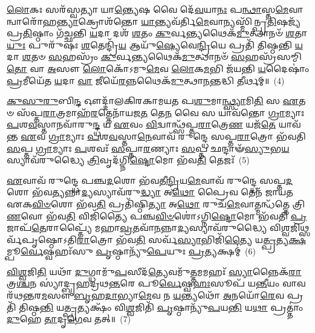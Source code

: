 \-\ul{𑌲𑍋}\-𑌕𑌃 𑌸𑌰᳴𑌸𑍍𑌵𑌤𑍍𑌯𑌾 𑌯𑌾\-\ul{𑌨𑍍𑌤𑍍𑌯𑍇}\-𑌷 𑌵𑍈 𑌦𑍇᳴\-\ul{𑌵}\-𑌯𑌾\-\ul{𑌨𑌃} 𑌪\-\ul{𑌨𑍍𑌥𑌾}\-𑌸𑍍𑌤\-\ul{𑌮𑍇}\-𑌵𑌾𑌨𑍍𑌵𑌾𑌰𑍋᳴𑌹\-\ul{𑌨𑍍𑌤𑍍𑌯𑌾}\-𑌕𑍍𑌰𑍋𑌶᳴𑌨𑍍𑌤𑍋 \ul{𑌯𑌾}\-𑌨𑍍𑌤𑍍𑌯𑌵᳴𑌰𑍍𑌤𑌿\-\ul{𑌮𑍇}\-𑌵𑌾𑌨𑍍𑌯𑌸𑍍𑌮𑌿᳴𑌨𑍍𑌪𑍍𑌰\-\ul{𑌤𑌿}\-𑌷𑌜𑍍𑌯᳴ 𑌪𑍍𑌰\-\ul{𑌤𑌿}\-𑌷𑍍𑌠𑌾𑌂 𑌗᳴𑌚𑍍𑌛𑌨𑍍𑌤𑌿 \ul{𑌯}\-𑌦𑌾 𑌦𑌶᳴ \ul{𑌶}\-𑌤𑌂 \ul{𑌕𑍁}\-𑌰𑍍𑌵𑌨𑍍𑌤𑍍𑌯𑌥𑍈𑌕᳴\-\ul{𑌮𑍁}\-𑌤𑍍𑌥𑌾𑌨𑍞᳴ \ul{𑌶}\-𑌤𑌾\-\ul{𑌯𑍁𑌃} 𑌪𑍁𑌰𑍁᳴𑌷𑌃 \ul{𑌶}\-𑌤𑍇𑌨𑍍𑌦𑍍𑌰𑌿᳴\-\ul{𑌯} 𑌆𑌯𑍁᳴\-\ul{𑌷𑍍𑌯𑍇}\-𑌵𑍇\-\ul{𑌨𑍍𑌦𑍍𑌰𑌿}\-𑌯𑍇 𑌪𑍍𑌰𑌤𑌿᳴ 𑌤𑌿𑌷𑍍𑌠𑌨𑍍𑌤𑌿 \ul{𑌯}\-𑌦𑌾 \ul{𑌶}\-𑌤𑍞 \ul{𑌸}\-𑌹𑌸𑍍𑌰𑌂᳴ \ul{𑌕𑍁}\-𑌰𑍍𑌵𑌨𑍍𑌤𑍍𑌯𑌥𑍈𑌕᳴\-\ul{𑌮𑍁}\-𑌤𑍍𑌥𑌾𑌨𑍞᳴ \ul{𑌸}\-𑌹𑌸𑍍𑌰᳴𑌸𑌮𑍍𑌮𑌿\-\ul{𑌤𑍋} 𑌵𑌾 \ul{𑌅}\-𑌸𑍗 \ul{𑌲𑍋}\-𑌕𑍋᳴\-𑌽𑌮𑍁\-\ul{𑌮𑍇}\-𑌵 \ul{𑌲𑍋}\-𑌕\-\ul{𑌮}\-𑌭𑌿 𑌜᳴𑌯𑌨𑍍𑌤𑌿 \ul{𑌯}\-𑌦𑍈𑌷𑌾𑌂॑ \ul{𑌪𑍍𑌰}\-𑌮𑍀𑌯𑍇᳴𑌤 \ul{𑌯}\-𑌦𑌾 \ul{𑌵𑌾} 𑌜𑍀𑌯𑍇᳴\-\ul{𑌰}\-𑌨𑍍𑌨𑌥𑍈𑌕᳴\-\ul{𑌮𑍁}\-𑌤𑍍𑌥𑌾\-\ul{𑌨}\-𑌨𑍍𑌤𑌦𑍍𑌧𑌿 \ul{𑌤𑍀}\-𑌰𑍍𑌥𑌮𑍍॥~(4)

{\anuvakamend[{\-\ul{𑌪𑍃}\-𑌷𑍍𑌠𑌾𑌨𑌿᳴ 𑌸𑌪𑍍𑌤\-\ul{𑌦}\-𑌶𑌃 𑌸𑍁᳴\-\ul{𑌵}\-𑌰𑍍𑌗𑍋 𑌜᳴𑌯𑌨𑍍𑌤𑌿 \ul{𑌯}\-𑌦𑍈𑌕𑌾᳴\-𑌦𑌶 𑌚}]}%

\-\ul{𑌕𑍁}\-\-\ul{𑌸𑍁}\-\-\ul{𑌰𑍁}\-𑌬𑌿\-\ul{𑌨𑍍𑌦} 𑌔𑌦𑍍𑌦𑌾᳴𑌲𑌕𑌿𑌰𑌕𑌾𑌮𑌯𑌤 𑌪\-\ul{𑌶𑍁}\-𑌮𑌾\-\ul{𑌨𑍍𑌥𑍍𑌸𑍍𑌯𑌾}\-𑌮𑌿\-\ul{𑌤𑌿} 𑌸 \ul{𑌏}\-𑌤𑍞 𑌸᳴𑌪𑍍𑌤\-\ul{𑌰𑌾}\-𑌤𑍍𑌰𑌮𑌾𑌹᳴\-\ul{𑌰}\-𑌤𑍍𑌤𑍇𑌨𑌾᳴𑌯𑌜\-\ul{𑌤} 𑌤𑍇\-\ul{𑌨} 𑌵𑍈 𑌸 𑌯𑌾𑌵᳴𑌨𑍍𑌤𑍋 \ul{𑌗𑍍𑌰𑌾}\-𑌮𑍍𑌯𑌾𑌃 \ul{𑌪}\-𑌶\-\ul{𑌵}\-𑌸𑍍𑌤𑌾𑌨𑌵𑌾᳴𑌰𑍁\-\ul{𑌨𑍍𑌦𑍍𑌧} 𑌯 \ul{𑌏}\-𑌵𑌂 \ul{𑌵𑌿}\-𑌦𑍍𑌵𑌾𑌨𑍍𑌥𑍍𑌸᳴𑌪𑍍𑌤\-\ul{𑌰𑌾}\-𑌤𑍍𑌰𑍇\-\ul{𑌣} 𑌯𑌜᳴\-\ul{𑌤𑍇} 𑌯𑌾𑌵᳴𑌨𑍍𑌤 \ul{𑌏}\-𑌵 \ul{𑌗𑍍𑌰𑌾}\-𑌮𑍍𑌯𑌾𑌃 \ul{𑌪}\-𑌶\-\ul{𑌵}\-𑌸𑍍𑌤𑌾\-\ul{𑌨𑍇}\-𑌵𑌾𑌵᳴ 𑌰𑍁𑌨𑍍𑌦𑍍𑌧𑍇 𑌸𑌪𑍍𑌤\-\ul{𑌰𑌾}\-𑌤𑍍𑌰𑍋 𑌭᳴𑌵𑌤𑌿 \ul{𑌸}\-𑌪𑍍𑌤 \ul{𑌗𑍍𑌰𑌾}\-𑌮𑍍𑌯𑌾𑌃 \ul{𑌪}\-𑌶𑌵𑌃᳴ \ul{𑌸}\-𑌪𑍍𑌤𑌾\-\ul{𑌰}\-𑌣𑍍𑌯𑌾𑌃 \ul{𑌸}\-𑌪𑍍𑌤 𑌛𑌨𑍍𑌦𑌾𑍟᳴\-\ul{𑌸𑍍𑌯𑍁}\-𑌭\-\ul{𑌯}\-𑌸𑍍𑌯𑌾𑌵᳴𑌰𑍁𑌦𑍍𑌧𑍍𑌯𑍈 \ul{𑌤𑍍𑌰𑌿}\-𑌵𑍃𑌦᳴𑌗𑍍𑌨𑌿\-\ul{𑌷𑍍𑌟𑍋}\-𑌮𑍋 𑌭᳴𑌵\-\ul{𑌤𑌿} 𑌤𑍇𑌜𑌃᳴~(5)

\-\ul{𑌏}\-𑌵𑌾𑌵᳴ 𑌰𑍁𑌨𑍍𑌦𑍍𑌧𑍇 𑌪𑌞𑍍𑌚\-\ul{𑌦}\-𑌶𑍋 𑌭᳴𑌵𑌤𑍀\-\ul{𑌨𑍍𑌦𑍍𑌰𑌿}\-𑌯\-\ul{𑌮𑍇}\-𑌵𑌾𑌵᳴ 𑌰𑍁𑌨𑍍𑌦𑍍𑌧𑍇 𑌸𑌪𑍍𑌤\-\ul{𑌦}\-𑌶𑍋 𑌭᳴𑌵\-\ul{𑌤𑍍𑌯}\-𑌨𑍍𑌨𑌾\-\ul{𑌦𑍍𑌯}\-𑌸𑍍𑌯𑌾𑌵᳴𑌰𑍁\-\ul{𑌦𑍍𑌧𑍍𑌯𑌾} 𑌅\-\ul{𑌥𑍋} 𑌪𑍍𑌰𑍈𑌵 𑌤𑍇𑌨᳴ 𑌜𑌾𑌯𑌤 𑌏𑌕\-\ul{𑌵𑌿}\-\-\ul{𑍞}\-𑌶𑍋 𑌭᳴𑌵\-\ul{𑌤𑌿} 𑌪𑍍𑌰𑌤𑌿᳴𑌷𑍍𑌠𑌿\-\ul{𑌤𑍍𑌯𑌾} 𑌅\-\ul{𑌥𑍋} 𑌰𑍁𑌚᳴\-\ul{𑌮𑍇}\-𑌵𑌾𑌤𑍍𑌮𑌨𑍍𑌧᳴𑌤𑍍𑌤𑍇 𑌤𑍍𑌰𑌿\-\ul{𑌣}\-𑌵𑍋 𑌭᳴𑌵\-\ul{𑌤𑌿} 𑌵𑌿𑌜𑌿᳴𑌤𑍍𑌯𑍈 𑌪𑌞𑍍𑌚\-\ul{𑌵𑌿}\-\-\ul{𑍞}\-𑌶𑍋॑\-𑌽𑌗𑍍𑌨𑌿\-\ul{𑌷𑍍𑌟𑍋}\-𑌮𑍋 𑌭᳴𑌵𑌤𑌿 \ul{𑌪𑍍𑌰}\-𑌜𑌾𑌪᳴\-\ul{𑌤𑍇}\-𑌰𑌾𑌪𑍍𑌤𑍍𑌯𑍈᳴ 𑌮𑌹𑌾\-\ul{𑌵𑍍𑌰}\-𑌤𑌵𑌾᳴\-\ul{𑌨}\-𑌨𑍍𑌨𑌾\-\ul{𑌦𑍍𑌯}\-𑌸𑍍𑌯𑌾𑌵᳴𑌰𑍁𑌦𑍍𑌧𑍍𑌯𑍈 𑌵𑌿\-\ul{𑌶𑍍𑌵}\-𑌜𑌿𑌥𑍍𑌸𑌰𑍍𑌵᳴𑌪𑍃𑌷𑍍𑌠𑍋\-𑌽𑌤𑌿\-\ul{𑌰𑌾}\-𑌤𑍍𑌰𑍋 𑌭᳴𑌵\-\ul{𑌤𑌿} 𑌸𑌰𑍍𑌵᳴\-\ul{𑌸𑍍𑌯𑌾}\-𑌭𑌿𑌜𑌿᳴\-\ul{𑌤𑍍𑌯𑍈} 𑌯\-\ul{𑌤𑍍𑌪𑍍𑌰}\-𑌤𑍍𑌯\-\ul{𑌕𑍍𑌷}\-𑌮𑍍𑌪𑍂\-\ul{𑌰𑍍𑌵𑍇}\-𑌷𑍍𑌵𑌹𑌃᳴𑌸𑍁 \ul{𑌪𑍃}\-𑌷𑍍𑌠𑌾𑌨𑍍𑌯𑍁᳴\-\ul{𑌪𑍇}\-𑌯𑍁𑌃 \ul{𑌪𑍍𑌰}\-𑌤𑍍𑌯𑌕𑍍𑌷𑌮𑍍॑~(6)

\-\ul{𑌵𑌿}\-\-\ul{𑌶𑍍𑌵}\-𑌜𑌿\-\ul{𑌤𑌿} 𑌯𑌥𑌾᳴ \ul{𑌦𑍁}\-𑌗𑍍𑌧𑌾𑌮𑍁᳴\-\ul{𑌪}\-𑌸𑍀𑌦᳴\-\ul{𑌤𑍍𑌯𑍇}\-𑌵𑌮𑍁᳴\-\ul{𑌤𑍍𑌤}\-𑌮𑌮𑌹𑌃᳴ \ul{𑌸𑍍𑌯𑌾}\-𑌨𑍍𑌨𑍈𑌕᳴\-\ul{𑌰𑌾}\-𑌤𑍍𑌰\-\ul{𑌶𑍍𑌚}\-𑌨 𑌸𑍍𑌯𑌾॑𑌦𑍍𑌬𑍃𑌹𑌦𑍍𑌰𑌥\-\ul{𑌨𑍍𑌤}\-𑌰𑍇 𑌪𑍂\-\ul{𑌰𑍍𑌵𑍇}\-𑌷𑍍𑌵\-\ul{𑌹𑌃}\-𑌸𑍂𑌪᳴ 𑌯\-\ul{𑌨𑍍𑌤𑍀}\-𑌯𑌂 𑌵𑌾𑌵 𑌰᳴𑌥\-\ul{𑌨𑍍𑌤}\-𑌰\-\ul{𑌮}\-𑌸𑍗 \ul{𑌬𑍃}\-𑌹\-\ul{𑌦𑌾}\-𑌭𑍍𑌯𑌾\-\ul{𑌮𑍇}\-𑌵 𑌨 \ul{𑌯}\-𑌨𑍍𑌤𑍍𑌯𑌥𑍋᳴ \ul{𑌅}\-𑌨𑌯𑍋᳴\-\ul{𑌰𑍇}\-𑌵 𑌪𑍍𑌰𑌤𑌿᳴ 𑌤𑌿𑌷𑍍𑌠\-\ul{𑌨𑍍𑌤𑌿} 𑌯\-\ul{𑌤𑍍𑌪𑍍𑌰}\-𑌤𑍍𑌯𑌕𑍍𑌷𑌂᳴ 𑌵𑌿\-\ul{𑌶𑍍𑌵}\-𑌜𑌿𑌤𑌿᳴ \ul{𑌪𑍃}\-𑌷𑍍𑌠𑌾𑌨𑍍𑌯𑍁᳴\-\ul{𑌪}\-𑌯\-\ul{𑌨𑍍𑌤𑌿} 𑌯\-\ul{𑌥𑌾} 𑌪𑍍𑌰𑌤𑍍𑌤𑌾𑌂॑ \ul{𑌦𑍁}\-𑌹𑍇 \ul{𑌤𑌾}\-𑌦𑍃\-\ul{𑌗𑍇}\-𑌵 𑌤𑌤𑍍॥~(7)

